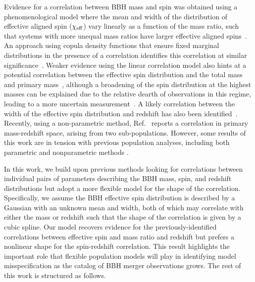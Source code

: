 \begin{refsection}
Evidence for a correlation between \ac{BBH} mass and spin was obtained using a phenomenological model where the mean and width of the distribution of effective aligned spin ($\chi_{\rm eff}$) vary linearly as a function of the mass ratio, such that systems with more unequal mass ratios have larger effective aligned spins~\citep{Callister:2021fpo, KAGRA:2021duu}. An approach using copula density functions that ensure fixed marginal distributions in the presence of a correlation identifies this correlation at similar significance~\cite{Adamcewicz:2022hce, Adamcewicz:2023mov}. Weaker evidence using the linear correlation model also hints at a potential correlation between the effective spin distribution and the total mass and primary mass~\cite{Safarzadeh:2020mlb, Franciolini:2022iaa, Biscoveanu:2022qac}, although a broadening of the spin distribution at the highest masses can be explained due to the relative dearth of observations in this regime, leading to a more uncertain measurement~\cite{Tiwari:2021yvr}. A likely correlation between the width of the effective spin distribution and redshift has also been identified~\cite{Biscoveanu:2022qac}. Recently, using a non-parametric method, Ref.~\cite{Rinaldi:2023bbd} reports a correlation in primary mass-redshift space, arising from two sub-populations. However, some results of this work are in tension with previous population analyses, including both parametric and nonparametric methods \cite[e.g.][]{vanSon:2021zpk, Tiwari:2021yvr, Edelman:2022ydv, Callister:2023tgi}. %

In this work, we build upon previous methods looking for correlations between individual pairs of parameters describing the \ac{BBH} mass, spin, and redshift distributions but adopt a more flexible model for the shape of the correlation. Specifically, we assume the \ac{BBH} effective spin distribution is described by a Gaussian with an unknown mean and width, both of which may correlate with either the mass or redshift such that the shape of the correlation is given by a cubic spline. Our model recovers evidence for the previously-identified correlations between effective spin and mass ratio and redshift but prefers a nonlinear shape for the spin-redshift correlation. This result highlights the important role that flexible population models will play in identifying model misspecification as the catalog of \ac{BBH} merger observations grows. The rest of this work is structured as follows. 


\end{refsection}
